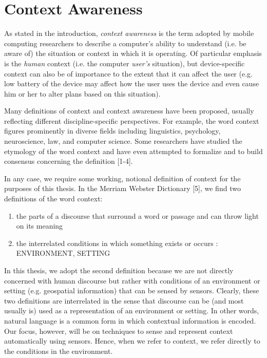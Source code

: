 \chapter{Context Awareness}
\label{ch:overview}

As stated in the introduction, \emph{context awareness} is the term adopted by mobile computing researchers to describe a computer's ability to understand (i.e. be aware of) the situation or context in which it is operating. Of particular emphasis is the \emph{human} context (i.e. the computer \emph{user's} situation), but device-specific context can also be of importance to the extent that it can affect the user (e.g. low battery of the device may affect how the user uses the device and even cause him or her to alter plans based on this situation).

Many definitions of context and context awareness have been proposed, usually reflecting different discipline-specific perspectives. For example, the word context figures prominently in diverse fields including linguistics, psychology, neuroscience, law, and computer science. Some researchers have studied the etymology of the word context and have even attempted to formalize and to build consensus concerning the definition [1-4].

In any case, we require some working, notional definition of context for the purposes of this thesis. In the Merriam Webster Dictionary [5], we find two definitions of the word context:

\begin{enumerate}
  \item the parts of a discourse that surround a word or passage and can throw light on its meaning
  \item the interrelated conditions in which something exists or occurs : ENVIRONMENT, SETTING
\end{enumerate}

In this thesis, we adopt the second definition because we are not directly concerned with human discourse but rather with conditions of an environment or setting (e.g. geospatial information) that can be sensed by sensors. Clearly, these two definitions are interrelated in the sense that discourse can be (and most usually is) used as a representation of an environment or setting. In other words, natural language is a common form in which contextual information is encoded. Our focus, however, will be on techniques to sense and represent context automatically using sensors. Hence, when we refer to context, we refer directly to the conditions in the environment.

